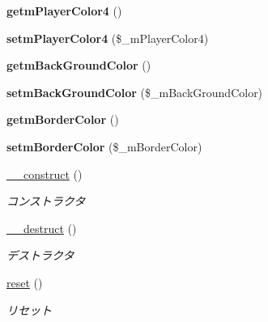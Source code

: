 \begin{DoxyCompactItemize}
{\bfseries getm\+Player\+Color4} ()
\item 
\mbox{\label{class_reversi_setting_a6914b9225724e48ab68681c87599b1c6}} 
{\bfseries setm\+Player\+Color4} (\$\+\_\+m\+Player\+Color4)
\item 
\mbox{\label{class_reversi_setting_a540a19fc7d4fb7c17efa3c76403f4061}} 
{\bfseries getm\+Back\+Ground\+Color} ()
\item 
\mbox{\label{class_reversi_setting_ae9013ece88de1d06960aeeafe29b27e7}} 
{\bfseries setm\+Back\+Ground\+Color} (\$\+\_\+m\+Back\+Ground\+Color)
\item 
\mbox{\label{class_reversi_setting_a91454a61fd72638be2703907a8f81a75}} 
{\bfseries getm\+Border\+Color} ()
\item 
\mbox{\label{class_reversi_setting_a59c73e106597e9e52ad6f531f7de2ffd}} 
{\bfseries setm\+Border\+Color} (\$\+\_\+m\+Border\+Color)
\item 
\hyperlink{class_reversi_setting_a095c5d389db211932136b53f25f39685}{\+\_\+\+\_\+construct} ()
\begin{DoxyCompactList}\small\item\em コンストラクタ \end{DoxyCompactList}\item 
\hyperlink{class_reversi_setting_a421831a265621325e1fdd19aace0c758}{\+\_\+\+\_\+destruct} ()
\begin{DoxyCompactList}\small\item\em デストラクタ \end{DoxyCompactList}\item 
\hyperlink{class_reversi_setting_a4a20559544fdf4dcb457e258dc976cf8}{reset} ()
\begin{DoxyCompactList}\small\item\em リセット \end{DoxyCompactList}\end{DoxyCompactItemize}

